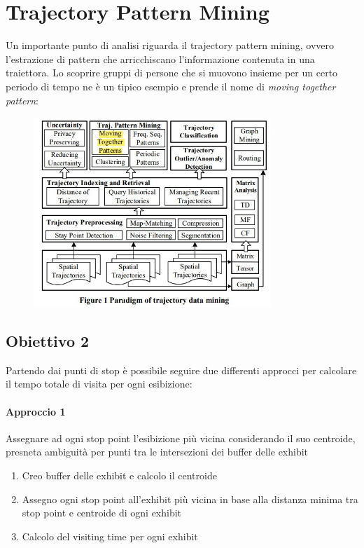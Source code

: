 \documentclass[12pt]{article}
\begin{document}
\section{Trajectory Pattern Mining}
Un importante punto di analisi riguarda il trajectory pattern mining, ovvero l'estrazione di pattern che arricchiscano l'informazione contenuta in una traiettora. Lo scoprire gruppi di persone che si muovono insieme per un certo periodo di tempo ne è un tipico esempio e prende il nome di \textit{moving together pattern}:
\begin{figure}[htb!]
    \centering
    \includegraphics[width=0.8\textwidth]{images/mtp.jpg}
\end{figure}
\FloatBarrier
\subsection{Obiettivo 2}
Partendo dai punti di stop è possibile seguire due differenti approcci per calcolare il tempo totale di visita per ogni esibizione:
\paragraph{Approccio 1} Assegnare ad ogni stop point l'esibizione più vicina considerando il suo centroide, presneta ambiguità per punti tra le intersezioni dei buffer delle exhibit
\begin{enumerate}
    \item Creo buffer delle exhibit e calcolo il centroide
    \item Assegno ogni stop point all'exhibit più vicina in base alla distanza minima tra stop point e centroide di ogni exhibit
    \item Calcolo del visiting time per ogni exhibit
\end{enumerate}
\end{document}
